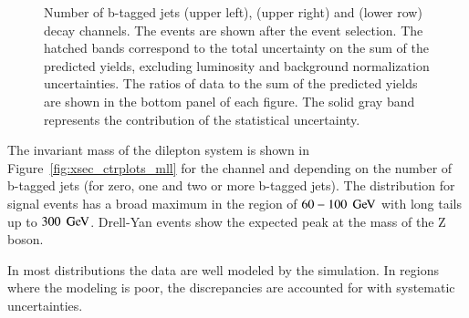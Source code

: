 \begin{figure}[htbp!]
\begin{center}
    \caption{Number of b-tagged jets \emu (upper left), \mumu (upper right) and \ee (lower row) decay channels.
        The events are shown after the
        event selection.  The hatched
        bands correspond to the total uncertainty on the sum of the
        predicted yields, excluding luminosity and background
        normalization uncertainties. 
        The ratios of data to the sum of the predicted yields are
        shown in the bottom panel of each figure. The solid gray band
        represents the contribution of the statistical uncertainty.}  
       \label{fig:xsec_bjets_ctrplots}
  \end{center}
\end{figure}


The invariant mass of the dilepton system is shown in Figure~\ref{fig:xsec_ctrplots_mll} for the \emu channel and depending on the number of b-tagged jets (for zero, one and two or more b-tagged jets).
The distribution for signal events has a broad maximum in the region of $60-100 \; \,\text{Ge\hspace{-.08em}V}$ with long tails up to $300 \; \,\text{Ge\hspace{-.08em}V}$.
Drell-Yan events show the expected peak at the mass of the Z boson.


In most distributions the data are well modeled by the simulation. In regions where the modeling is poor, the discrepancies are accounted for with systematic uncertainties.

